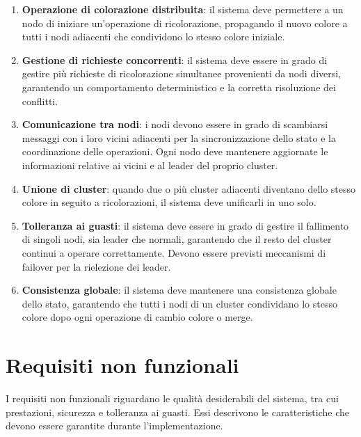 \documentclass[12pt, a4paper]{report}
\begin{document}
\begin{enumerate}
    \item \textbf{Operazione di colorazione distribuita}: il sistema deve permettere a un nodo di iniziare un'operazione di ricolorazione, propagando il nuovo colore a tutti i nodi adiacenti che condividono lo stesso colore iniziale.

    \item \textbf{Gestione di richieste concorrenti}: il sistema deve essere in grado di gestire pi\`u richieste di ricolorazione simultanee provenienti da nodi diversi, garantendo un comportamento deterministico e la corretta risoluzione dei conflitti.

    \item \textbf{Comunicazione tra nodi}: i nodi devono essere in grado di scambiarsi messaggi con i loro vicini adiacenti per la sincronizzazione dello stato e la coordinazione delle operazioni. Ogni nodo deve mantenere aggiornate le informazioni relative ai vicini e al leader del proprio cluster.

    \item \textbf{Unione di cluster}: quando due o pi\`u cluster adiacenti diventano dello stesso colore in seguito a ricolorazioni, il sistema deve unificarli in uno solo.

    \item \textbf{Tolleranza ai guasti}: il sistema deve essere in grado di gestire il fallimento di singoli nodi, sia leader che normali, garantendo che il resto del cluster continui a operare correttamente. Devono essere previsti meccanismi di failover per la rielezione dei leader.

    \item \textbf{Consistenza globale}: il sistema deve mantenere una consistenza globale dello stato, garantendo che tutti i nodi di un cluster condividano lo stesso colore dopo ogni operazione di cambio colore o merge.
\end{enumerate}

\newpage
\section{Requisiti non funzionali}\label{sec:requisiti_non_funzionali}

I requisiti non funzionali riguardano le qualit\`a desiderabili del sistema, tra cui prestazioni, sicurezza e tolleranza ai guasti. Essi descrivono le caratteristiche che devono essere garantite durante l'implementazione.
\end{document}
